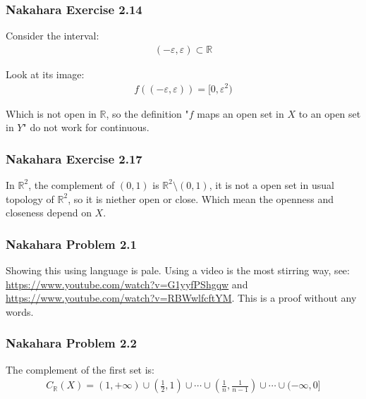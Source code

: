 \documentclass[]{ctexart}
\begin{document}
		\subsubsection{Nakahara Exercise 2.14}
			Consider the interval:
				\begin{equation*}
				\begin{aligned}
					(-\varepsilon,\varepsilon)\subset \mathbb{R}
				\end{aligned}
				\end{equation*}
			
			Look at its image:
				\begin{equation*}
				\begin{aligned}
					f((-\varepsilon,\varepsilon))=[0,\varepsilon^2)
				\end{aligned}
				\end{equation*}
			
			Which is not open in $\mathbb{R}$, so the definition "$f$ maps an open set in $X$ to an open set in $Y$" do not work for continuous. 
		
		\subsubsection{Nakahara Exercise 2.17}
			In $\mathbb{R}^2$, the complement of $(0,1)$ is $\mathbb{R}^2\setminus (0,1)$, it is not a open set in usual topology of $\mathbb{R}^2$, so it is niether open or close. Which mean the openness and closeness depend on $X$. 
		
		\subsubsection{Nakahara Problem 2.1}
			Showing this using language	is pale. Using a video is the most stirring way, see: \url{https://www.youtube.com/watch?v=G1yyfPShgqw} and \url{https://www.youtube.com/watch?v=RBWwlfcftYM}. This is a proof without any words. 
		
		\subsubsection{Nakahara Problem 2.2}
			The  complement of the first set is:
				\begin{equation*}
				\begin{aligned}
					C_{\mathbb{R}}(X)=(1,+\infty)\cup (\frac{1}{2},1)\cup \cdots \cup(\frac{1}{n},\frac{1}{n-1})\cup \cdots \cup(-\infty,0]
				\end{aligned}
				\end{equation*}
			
\end{document}
